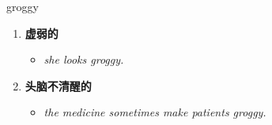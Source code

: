 
\begin{frame}
{\huge groggy}
\begin{center}
\begin{enumerate}\Large
  \item \textbf{虚弱的}
  \begin{itemize}
    \item \em{\Large{she looks groggy.}}
  \end{itemize}
  \item \textbf{头脑不清醒的}
  \begin{itemize}
    \item \em{\Large{the medicine sometimes make patients groggy.}}
  \end{itemize}
\end{enumerate}
\end{center}
\end{frame}
